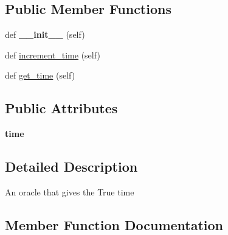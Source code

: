 \subsection*{Public Member Functions}
\begin{DoxyCompactItemize}
\item 
\mbox{\label{class_simulation_time_oracle_1_1_simulation_time_oracle_a6295da8dc38378a67d5db534e20d6426}} 
def {\bfseries \+\_\+\+\_\+init\+\_\+\+\_\+} (self)
\item 
def \mbox{\hyperlink{class_simulation_time_oracle_1_1_simulation_time_oracle_a2a89702650ee07d32b369da6eae552b9}{increment\+\_\+time}} (self)
\item 
def \mbox{\hyperlink{class_simulation_time_oracle_1_1_simulation_time_oracle_ad567bc0e28a99369aaa448370c9a1944}{get\+\_\+time}} (self)
\end{DoxyCompactItemize}
\subsection*{Public Attributes}
\begin{DoxyCompactItemize}
\item 
\mbox{\label{class_simulation_time_oracle_1_1_simulation_time_oracle_a9ec52d33610ad7fcdb3370017b13277a}} 
{\bfseries time}
\end{DoxyCompactItemize}


\subsection{Detailed Description}
\begin{DoxyVerb}An oracle that gives the True time
\end{DoxyVerb}
 

\subsection{Member Function Documentation}
\mbox{\label{class_simulation_time_oracle_1_1_simulation_time_oracle_ad567bc0e28a99369aaa448370c9a1944}} 
